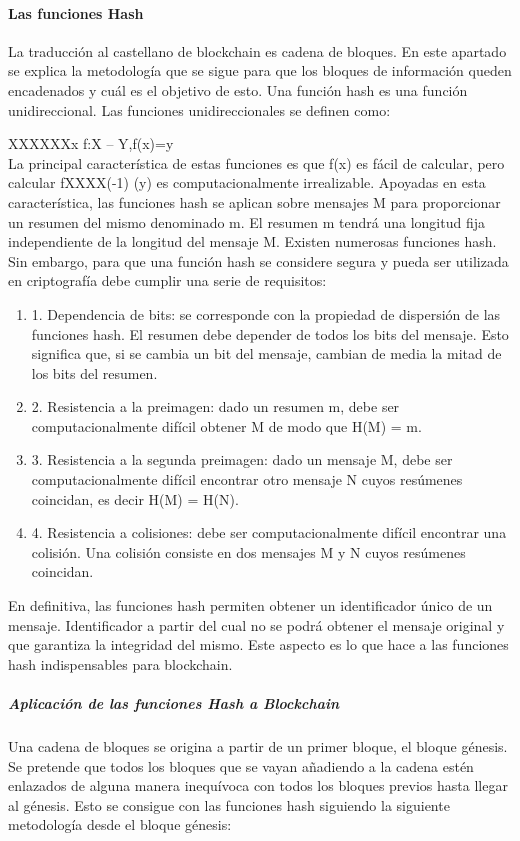 \paragraph{Las funciones Hash}
La traducción al castellano de blockchain es cadena de bloques. En este apartado se explica la metodología que se sigue para que los bloques de información queden encadenados y cuál es el objetivo de esto.
Una función hash es una función unidireccional. Las funciones unidireccionales se definen como:\newline


XXXXXXx f:X -- Y,f(x)=y \\
La principal característica de estas funciones es que f(x) es fácil de calcular, pero calcular fXXXX(-1) (y) es computacionalmente irrealizable. Apoyadas en esta característica, las funciones hash se aplican sobre mensajes M para proporcionar un resumen del mismo denominado m. El resumen m tendrá una longitud fija independiente de la longitud del mensaje M.
Existen numerosas funciones hash. Sin embargo, para que una función hash se considere segura y pueda ser utilizada en criptografía debe cumplir una serie de requisitos:

\begin{enumerate}
	\item 1.	Dependencia de bits: se corresponde con la propiedad de dispersión de las funciones hash. El resumen debe depender de todos los bits del mensaje. Esto significa que, si se cambia un bit del mensaje, cambian de media la mitad de los bits del resumen.
	\item 2.	Resistencia a la preimagen: dado un resumen m, debe ser computacionalmente difícil obtener M de modo que H(M) = m.
	\item 3.	Resistencia a la segunda preimagen: dado un mensaje M, debe ser computacionalmente difícil encontrar otro mensaje N cuyos resúmenes coincidan, es decir H(M) = H(N).
	\item 4.	Resistencia a colisiones: debe ser computacionalmente difícil encontrar una colisión. Una colisión consiste en dos mensajes M y N cuyos resúmenes coincidan. 
\end{enumerate}

En definitiva, las funciones hash permiten obtener un identificador único de un mensaje. Identificador a partir del cual no se podrá obtener el mensaje original y que garantiza la integridad del mismo. Este aspecto es lo que hace a las funciones hash indispensables para blockchain.

\subparagraph{Aplicación de las funciones Hash a Blockchain}
Una cadena de bloques se origina a partir de un primer bloque, el bloque génesis. Se pretende que todos los bloques que se vayan añadiendo a la cadena estén enlazados de alguna manera inequívoca con todos los bloques previos hasta llegar al génesis. Esto se consigue con las funciones hash siguiendo la siguiente metodología desde el bloque génesis:

